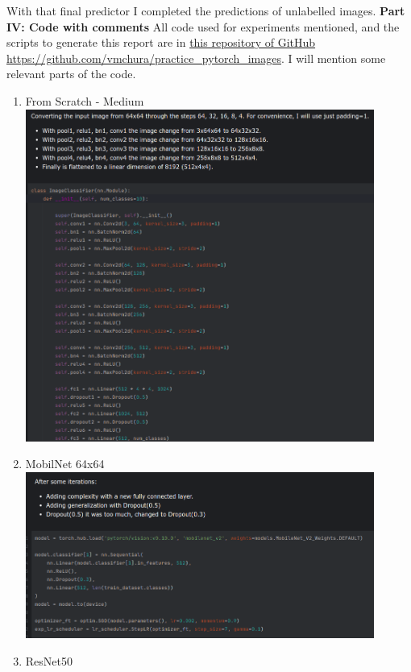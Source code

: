 \documentclass{cpsc202}
\begin{document}
    With that final predictor I completed the predictions of unlabelled images.
    \newpage
    \large\textbf{Part IV: Code with comments}
    All code used for experiments mentioned, and the scripts to generate this report are in \href{https://github.com/vmchura/practice_pytorch_images}{this repository of GitHub https://github.com/vmchura/practice\_pytorch\_images}.
    I will mention some relevant parts of the code.
    \begin{enumerate}
        \item From Scratch - Medium \\
        \includegraphics[width=0.9\textwidth]{scratch_medium}
        \item MobilNet 64x64 \\
        \includegraphics[width=0.9\textwidth]{mobilnet64}
        \item ResNet50 \\

\end{enumerate}
\end{document}

